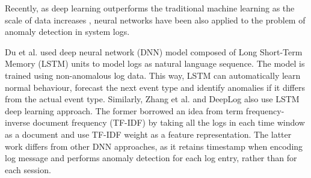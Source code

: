 Recently, as deep learning outperforms the traditional machine learning as the scale of data increases \cite{Sydney2019DeepLF}, neural networks have been also applied to the problem of anomaly detection in system logs. 

Du et al. \cite{duLSTM2017} used deep neural network (DNN) model composed of Long Short-Term Memory (LSTM) units to model logs as natural language sequence. The model is trained using non-anomalous log data. This way, LSTM can automatically learn normal behaviour, forecast the next event type and identify anomalies if it differs from the actual event type. Similarly, Zhang et al. \cite{zhang2016} and DeepLog \cite{deeplog2017} also use LSTM deep learning approach. The former borrowed an idea from term frequency-inverse document frequency (TF-IDF) by taking all the logs in each time window as a document and use TF-IDF weight as a feature representation. The latter work differs from other DNN approaches, as it retains timestamp when encoding log message and performs anomaly detection for each log entry, rather than for each session.
